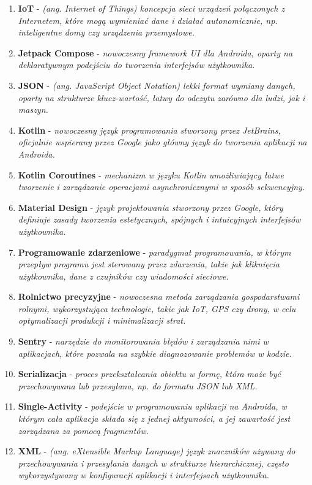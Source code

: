 \begin{enumerate}[leftmargin=*]
\item \textbf{IoT} - \textit{(ang. Internet of Things) koncepcja sieci urządzeń połączonych z Internetem, które mogą wymieniać dane i działać autonomicznie, np. inteligentne domy czy urządzenia przemysłowe.}
\item \textbf{Jetpack Compose} - \textit{nowoczesny framework UI dla Androida, oparty na deklaratywnym podejściu do tworzenia interfejsów użytkownika.}
\item \textbf{JSON} - \textit{(ang. JavaScript Object Notation) lekki format wymiany danych, oparty na strukturze klucz-wartość, łatwy do odczytu zarówno dla ludzi, jak i maszyn.}
\item \textbf{Kotlin} - \textit{nowoczesny język programowania stworzony przez JetBrains, oficjalnie wspierany przez Google jako główny język do tworzenia aplikacji na Androida.}
\item \textbf{Kotlin Coroutines} - \textit{mechanizm w języku Kotlin umożliwiający łatwe tworzenie i zarządzanie operacjami asynchronicznymi w sposób sekwencyjny.}
\item \textbf{Material Design} - \textit{język projektowania stworzony przez Google, który definiuje zasady tworzenia estetycznych, spójnych i intuicyjnych interfejsów użytkownika.}
\item \textbf{Programowanie zdarzeniowe} - \textit{paradygmat programowania, w którym przepływ programu jest sterowany przez zdarzenia, takie jak kliknięcia użytkownika, dane z czujników czy wiadomości sieciowe.}
\item \textbf{Rolnictwo precyzyjne} - \textit{nowoczesna metoda zarządzania gospodarstwami rolnymi, wykorzystująca technologie, takie jak IoT, GPS czy drony, w celu optymalizacji produkcji i minimalizacji strat.}
\item \textbf{Sentry} - \textit{narzędzie do monitorowania błędów i zarządzania nimi w aplikacjach, które pozwala na szybkie diagnozowanie problemów w kodzie.}
\item \textbf{Serializacja} - \textit{proces przekształcania obiektu w formę, która może być przechowywana lub przesyłana, np. do formatu JSON lub XML.}
\item \textbf{Single-Activity} - \textit{podejście w programowaniu aplikacji na Androida, w którym cała aplikacja składa się z jednej aktywności, a jej zawartość jest zarządzana za pomocą fragmentów.}
\item \textbf{XML} - \textit{(ang. eXtensible Markup Language) język znaczników używany do przechowywania i przesyłania danych w strukturze hierarchicznej, często wykorzystywany w konfiguracji aplikacji i interfejsach użytkownika.}
\end{enumerate}